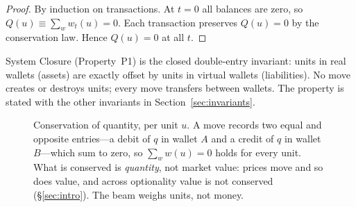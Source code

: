 \documentclass[11pt,a4paper]{article}
\begin{document}
\begin{proof}
By induction on transactions. At $t=0$ all balances are zero, so $Q(u) \equiv \sum_{w} w_t(u) = 0$. Each transaction preserves $Q(u) = 0$ by the conservation law. Hence $Q(u) = 0$ at all $t$.
\end{proof}

System Closure (Property~P1) is the closed double-entry invariant: units in real wallets (assets) are exactly offset by units in virtual wallets (liabilities). No move creates or destroys units; every move transfers between wallets. The property is stated with the other invariants in Section~\ref{sec:invariants}.

\begin{figure}[tb]
\centering
{}
\caption{Conservation of quantity, per unit $u$. A move records two equal and opposite
entries---a debit of $q$ in wallet $A$ and a credit of $q$ in wallet $B$---which sum to
zero, so $\sum_{w} w(u) = 0$ holds for every unit. What is conserved is \emph{quantity},
not market value: prices move and so does value, and across optionality value is not
conserved (\S\ref{sec:intro}). The beam weighs units, not money.}
\label{fig:conservation}
\end{figure}
\end{document}
